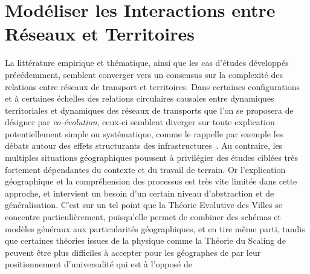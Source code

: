 

\chapter{Modéliser les Interactions entre Réseaux et Territoires}


\label{ch:modelinginteractions}





La littérature empirique et thématique, ainsi que les cas d'études développés précédemment, semblent converger vers un consensus sur la complexité des relations entre réseaux de transport et territoires. Dans certaines configurations et à certaines échelles des relations circulaires causales entre dynamiques territoriales et dynamiques des réseaux de transports que l'on se proposera de désigner par \emph{co-évolution}, ceux-ci semblent diverger sur toute explication potentiellement simple ou systématique, comme le rappelle par exemple les débats autour des effets structurants des infrastructures~\cite{offner1993effets}. Au contraire, les multiples situations géographiques poussent à privilégier des études ciblées très fortement dépendantes du contexte et du travail de terrain. Or l'explication géographique et la compréhension des processus est très vite limitée dans cette approche, et intervient un besoin d'un certain niveau d'abstraction et de généralisation. C'est sur un tel point que la Théorie Evolutive des Villes se concentre particulièrement, puisqu'elle permet de combiner des schémas et modèles généraux aux particularités géographiques, et en tire même parti, tandis que certaines théories issues de la physique comme la Théorie du Scaling de ~\cite{west2017scaling} peuvent être plus difficiles à accepter pour les géographes de par leur positionnement d'universalité qui est à l'opposé de 
